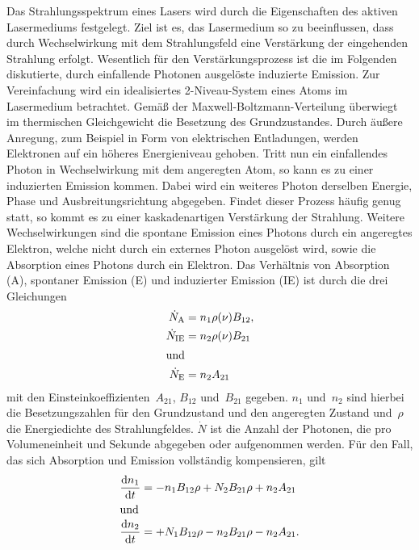 Das Strahlungsspektrum eines Lasers wird durch die Eigenschaften des aktiven
Lasermediums festgelegt. Ziel ist es, das Lasermedium so zu beeinflussen, dass
durch Wechselwirkung mit dem Strahlungsfeld eine Verstärkung der eingehenden
Strahlung erfolgt. Wesentlich für den Verstärkungsprozess ist die im Folgenden
diskutierte, durch einfallende Photonen ausgelöste induzierte Emission. Zur
Vereinfachung wird ein idealisiertes 2-Niveau-System eines Atoms im Lasermedium
betrachtet. Gemäß der Maxwell-Boltzmann-Verteilung überwiegt im thermischen
Gleichgewicht die Besetzung des Grundzustandes. Durch äußere Anregung, zum
Beispiel in Form von elektrischen Entladungen, werden Elektronen auf ein höheres
Energieniveau gehoben. Tritt nun ein einfallendes Photon in Wechselwirkung mit
dem angeregten Atom, so kann es zu einer induzierten Emission kommen. Dabei wird
ein weiteres Photon derselben Energie, Phase und Ausbreitungsrichtung abgegeben.
Findet dieser Prozess häufig genug statt, so kommt es zu einer kaskadenartigen
Verstärkung der Strahlung. Weitere Wechselwirkungen sind die spontane Emission
eines Photons durch ein angeregtes Elektron, welche nicht durch ein externes
Photon ausgelöst wird, sowie die Absorption eines Photons durch ein Elektron.
Das Verhältnis von Absorption (A), spontaner Emission (E) und induzierter
Emission (IE) ist durch die drei Gleichungen
%
\begin{align}
  \dot{N}_{\mathrm{A}}&=n_1\rho(\nu)B_{12}, \\
  \dot{N}_{\mathrm{IE}}&=n_2\rho(\nu)B_{21} \\
  \shortintertext{und}
  \dot{N}_{\mathrm{E}}&=n_2A_{21}
\end{align}
%
mit den Einsteinkoeffizienten~$A_{21}$, $B_{12}$ und~$B_{21}$ gegeben. $n_1$
und~$n_2$ sind hierbei die Besetzungszahlen für den Grundzustand und den
angeregten Zustand und~$\rho$ die Energiedichte des Strahlungfeldes. $\dot{N}$
ist die Anzahl der Photonen, die pro Volumeneinheit und Sekunde abgegeben oder
aufgenommen werden. Für den Fall, das sich Absorption und Emission vollständig
kompensieren, gilt
%
\begin{align}
  \frac{\mathrm{d}n_1}{\mathrm{d}t}&=-n_1B_{12}\rho+N_2B_{21}\rho+n_2A_{21} \\
  \shortintertext{und}
  \frac{\mathrm{d}n_2}{\mathrm{d}t}&=+N_1B_{12}\rho-n_2B_{21}\rho-n_2A_{21}.
\end{align}

